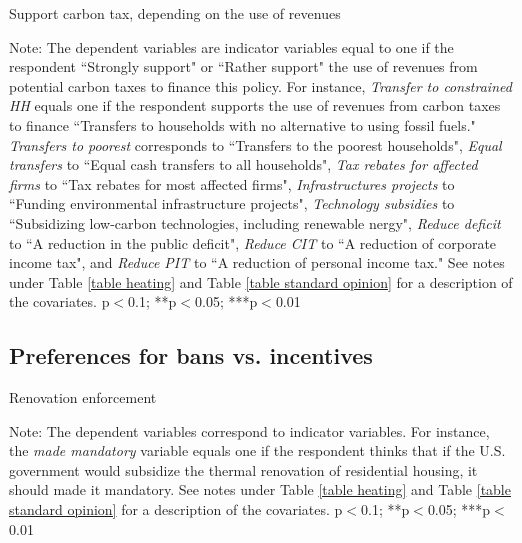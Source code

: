 \documentclass{article}
\begin{document}
\begin{landscape}
	\begin{table}[h!]
	\caption{Support carbon tax, depending on the use of revenues}
	\begin{center}
		\scalebox{0.6}{}
	\end{center}
	{\footnotesize Note: The dependent variables are indicator variables equal to one if the respondent ``Strongly support" or ``Rather support" the use of revenues from potential carbon taxes to finance this policy. For instance, \textit{Transfer to constrained HH} equals one if the respondent supports the use of revenues from carbon taxes to finance ``Transfers to households with no alternative to using fossil fuels." \textit{Transfers to poorest} corresponds to ``Transfers to the poorest households", \textit{Equal transfers} to ``Equal cash transfers to all households", \textit{Tax rebates for affected firms} to ``Tax rebates for most affected firms", \textit{Infrastructures projects} to ``Funding environmental infrastructure projects", \textit{Technology subsidies} to ``Subsidizing low-carbon technologies, including renewable nergy", \textit{Reduce deficit} to ``A reduction in the public deficit", \textit{Reduce CIT} to ``A reduction of corporate income tax", and \textit{Reduce PIT} to ``A reduction of personal income tax." See notes under Table \ref{table heating} and Table \ref{table standard opinion} for a description of the covariates.
	\newline *p$<$0.1; **p$<$0.05; ***p$<$0.01}
\end{table}	
\end{landscape}

\clearpage
\subsection{Preferences for bans vs. incentives}

\begin{table}[h!]
	\caption{Renovation enforcement}
	\begin{center}
		\scalebox{0.7}{}
	\end{center}
	{\footnotesize Note: The dependent variables correspond to indicator variables. For instance, the \textit{made mandatory} variable equals one if the respondent thinks that if the U.S. government would subsidize the thermal renovation of residential housing, it should made it mandatory. See notes under Table \ref{table heating} and Table \ref{table standard opinion} for a description of the covariates.
	\newline *p$<$0.1; **p$<$0.05; ***p$<$0.01}
\end{table}	
\end{document}
